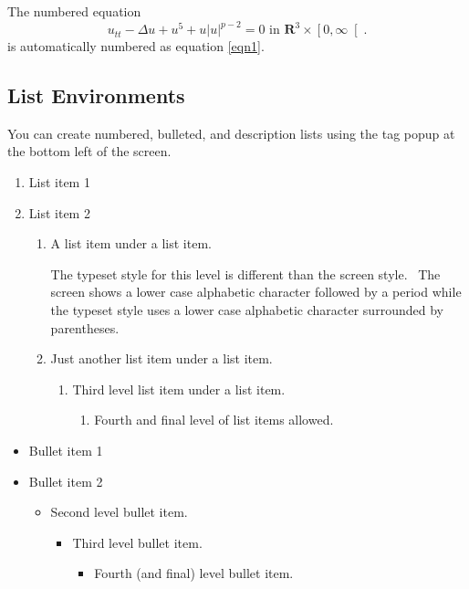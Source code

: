 \documentclass{article}
\begin{document}
The numbered equation 
\begin{equation}
u_{tt}-\Delta u+u^{5}+u\left| u\right| ^{p-2}=0\text{ in }\mathbf{R}%
^{3}\times \left[ 0,\infty \right[ .  \label{eqn1}
\end{equation}
is automatically numbered as equation \ref{eqn1}.

\subsection{List Environments}

You can create numbered, bulleted, and description lists using the tag popup
at the bottom left of the screen.

\begin{enumerate}
\item List item 1

\item List item 2

\begin{enumerate}
\item A list item under a list item.

The typeset style for this level is different than the screen style. \ The
screen shows a lower case alphabetic character followed by a period while
the typeset style uses a lower case alphabetic character surrounded by
parentheses.

\item Just another list item under a list item.

\begin{enumerate}
\item Third level list item under a list item.

\begin{enumerate}
\item Fourth and final level of list items allowed.
\end{enumerate}
\end{enumerate}
\end{enumerate}
\end{enumerate}

\begin{itemize}
\item Bullet item 1

\item Bullet item 2

\begin{itemize}
\item Second level bullet item.

\begin{itemize}
\item Third level bullet item.

\begin{itemize}
\item Fourth (and final) level bullet item.
\end{itemize}
\end{itemize}
\end{itemize}
\end{itemize}
\end{document}
